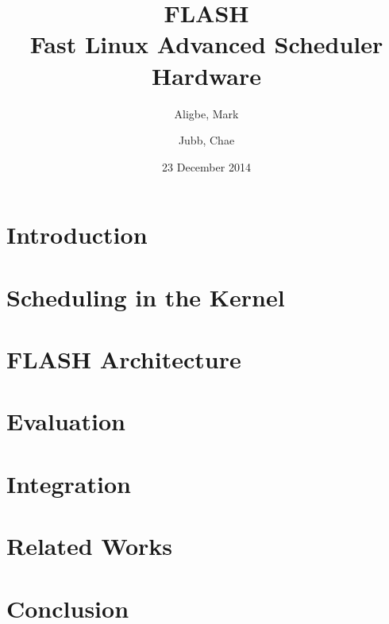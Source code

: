 \documentclass{sig-alternate-10pt}
\title{FLASH\\Fast Linux Advanced Scheduler Hardware}
\author{
	Aligbe, Mark \\
	    \email{ma2799@columbia.edu}
	\and
    Jubb, Chae \\
        \email{ecj2122@columbia.edu}
}
\date{23 December 2014}
\begin{document}
\maketitle

\begin{abstract}
\lipsum[1]
\end{abstract}

\section{Introduction}
\lipsum[1]

\section{Scheduling in the Kernel}
\lipsum[1]

\section{FLASH Architecture}
\lipsum[1]

\section{Evaluation}
\lipsum[1]

\section{Integration}
\lipsum[1]

\section{Related Works}
\lipsum[1]

\section{Conclusion}
\lipsum[1]
\end{document}
